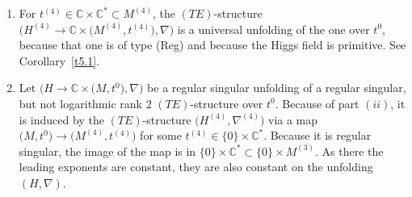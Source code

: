 \documentclass[pdftex]{sigma}%
\numberwithin{equation}{section}
\numberwithin{figure}{section}
\newcommand{\N}{{\mathbb N}}
\newcommand{\C}{{\mathbb C}}
\renewcommand{\P}{{\mathbb P}}
\newcommand{\NN}{{\mathcal N}}
\newcommand{\www}{\widetilde}
\newcommand{\uuuu}{\underline}
\newcommand{\paa}{\partial}
\newcommand{\nnn}{\nabla}
\begin{document}
\begin{Remarks}
\begin{enumerate}
Then the matrices $A_2$ and $B$ with
$z\nnn_{\paa_i}\uuuu{v}^{(4)}=\uuuu{v}^{(4)}A_i$ and
$z^2\nnn_{\paa_z}\uuuu{v}^{(4)}=\uuuu{v}^{(4)}B$ are unchanged,
and $A_1=C_1$, so
\begin{gather*}%
A_1=C_1,\quad A_2=C_2\quad \text{(as in~\eqref{7.1})},\qquad
B\quad\text{is as in~\eqref{4.57} or~\eqref{4.59}}.
\end{gather*}
The Higgs field is everywhere on $M^{(4)}$ primitive.
By Theorem~\ref{t3.14},
$M^{(4)}=\C\times\P^1$ is an~$F$-manifold with Euler field.
The unit field is $\paa_1$, the multiplication is given
by $\paa_2\circ\paa_2=0$ and $\www\paa_2\circ\www\paa_2=0$.
So, each germ $\big(M^{(4)},t^0\big)$ is the germ $\NN_2$.
The Euler field is
\begin{gather*}
\begin{split}%
&E= t_1\paa_1 + (\alpha_1-\alpha_2)t_2\paa_2
=t_1\paa_1 + (\alpha_2-\alpha_1)\www t_2\www\paa_2
\\
&\qquad\begin{cases}
\text{in the case~\eqref{4.57} and~\eqref{4.58}
and in $(ii)$ above,}
\\
\text{and in the case~\eqref{4.59} and~\eqref{4.60}
 with }\alpha_1-\alpha_2\in\N,\end{cases}
 \\
&E= t_1\paa_1 -\paa_2
=t_1\paa_1 + \www t_2^2\www\paa_2\qquad
\text{in the case~\eqref{4.59} and~\eqref{4.60}
with }\alpha_1=\alpha_2.%
\end{split}
\end{gather*}

\item[$(ii)$] For $t^{(4)}\in \C\times\C^*\subset M^{(4)}$,
the $(TE)$-structure
$\big(H^{(4)}\to \C\times \big(M^{(4)},t^{(4)}\big),\nnn\big)$
is a universal unfolding of the one over $t^0$,
because that one is of type (Reg) and because the
Higgs field is primitive. See Corollary~\ref{t5.1}.

\item[$(iii)$] Let $\big(H\to\C\times \big(M,t^0\big),\nnn\big)$ be a regular
singular unfolding of a regular singular, but not
logarithmic rank $2$ $(TE)$-structure over $t^0$.
Because of part $(ii)$, it is induced by the
$(TE)$-structure $\big(H^{(4)},\nnn^{(4)}\big)$ via a map
$\big(M,t^0\big)\to \big(M^{(4)},t^{(4)}\big)$ for some
$t^{(4)}\in\{0\}\times \C^*$.
Because it is regular singular, the image of the map
is in $\{0\}\times \C^*\subset \{0\}\times M^{(3)}$.
As there the leading exponents are constant,
they are also constant on the unfolding $(H,\nnn)$.
\end{enumerate}
\end{Remarks}
\end{document}

